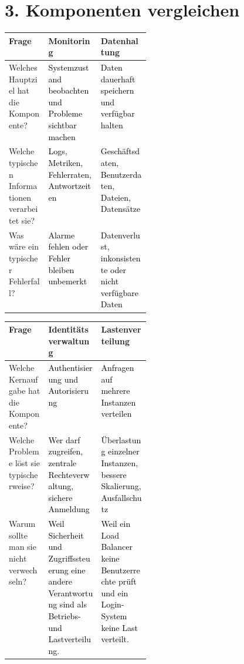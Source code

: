 \documentclass[11pt,a4paper]{article}
\newcommand{\solution}[1]{\textcolor{black}{#1}}
\begin{document}
\section*{3. Komponenten vergleichen}
\begin{tabularx}{\linewidth}{|>{\raggedright\arraybackslash}p{0.28\linewidth}|>{\raggedright\arraybackslash}X|>{\raggedright\arraybackslash}X|}
\hline
\textbf{Frage} & \textbf{Monitoring} & \textbf{Datenhaltung} \\
\hline
Welches Hauptziel hat die Komponente? & \solution{Systemzustand beobachten und Probleme sichtbar machen} & \solution{Daten dauerhaft speichern und verfügbar halten} \\ \hline
Welche typischen Informationen verarbeitet sie? & \solution{Logs, Metriken, Fehlerraten, Antwortzeiten} & \solution{Geschäftsdaten, Benutzerdaten, Dateien, Datensätze} \\ \hline
Was wäre ein typischer Fehlerfall? & \solution{Alarme fehlen oder Fehler bleiben unbemerkt} & \solution{Datenverlust, inkonsistente oder nicht verfügbare Daten} \\ \hline
\end{tabularx}

\vspace{1em}

\begin{tabularx}{\linewidth}{|>{\raggedright\arraybackslash}p{0.28\linewidth}|>{\raggedright\arraybackslash}X|>{\raggedright\arraybackslash}X|}
\hline
\textbf{Frage} & \textbf{Identitätsverwaltung} & \textbf{Lastenverteilung} \\
\hline
Welche Kernaufgabe hat die Komponente? & \solution{Authentisierung und Autorisierung} & \solution{Anfragen auf mehrere Instanzen verteilen} \\ \hline
Welche Probleme löst sie typischerweise? & \solution{Wer darf zugreifen, zentrale Rechteverwaltung, sichere Anmeldung} & \solution{Überlastung einzelner Instanzen, bessere Skalierung, Ausfallschutz} \\ \hline
Warum sollte man sie nicht verwechseln? & \solution{Weil Sicherheit und Zugriffssteuerung eine andere Verantwortung sind als Betriebs- und Lastverteilung.} & \solution{Weil ein Load Balancer keine Benutzerrechte prüft und ein Login-System keine Last verteilt.} \\ \hline
\end{tabularx}
\end{document}
